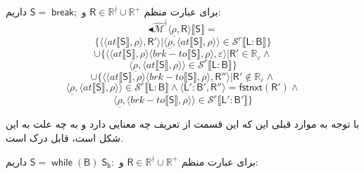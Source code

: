  برای عبارت منظم 
 $\mathsf{R} \in \mathbb{R}^\nmid \cup \mathbb{R^+}$
 و 
 $\mathsf{S= \; break;}$
 داریم:
$$\blacktriangleleft \mathcal{\hat{M}^\nmid} \langle \underline{\rho}, \mathsf{R} \rangle 
\llbracket \mathsf{S} \rrbracket= $$
$$\{\langle \langle at \llbracket \mathsf{S} \rrbracket,\rho \rangle , \mathsf{R'} \rangle | \langle \underline{\rho} , \langle at \llbracket \mathsf{S} \rrbracket , \rho \rangle \rangle \in \mathcal{S}^r \llbracket \mathsf{L:B} \rrbracket\}$$
$$\cup \{ \langle \langle at \llbracket \mathsf{S} \rrbracket , \rho \rangle \langle brk-to \llbracket \mathsf{S} \rrbracket , \rho \rangle , \varepsilon \rangle | \mathsf{R'} \in \mathbb{R_\varepsilon} \land$$
$$\langle \underline{\rho}, \langle at \llbracket \mathsf{S} \rrbracket, \rho \rangle \rangle \in \mathcal{S}^r \llbracket \mathsf{L:B} \rrbracket \}$$
$$\cup \{ \langle \langle at \llbracket \mathsf{S} \rrbracket , \rho \rangle \langle brk-to \llbracket \mathsf{S} \rrbracket,\rho \rangle ,\mathsf{R''} \rangle | \mathsf{R'} \notin \mathbb{R_\varepsilon} \land$$
$$ \langle \underline{\rho},\langle at \llbracket \mathsf{S} \rrbracket , \rho \rangle \rangle \in \mathcal{S}^r \llbracket \mathsf{L:B} \rrbracket \land \langle \mathsf{L':B',R''} \rangle = \mathsf{fstnxt(R') \land}$$
$$\langle \underline{\rho}, \langle brk-to \llbracket \mathsf{S} \rrbracket, \rho \rangle \rangle \in \mathcal{S}^r \llbracket \mathsf{L':B'} \rrbracket \}$$
	    
 با توجه به موارد قبلی این که این قسمت از تعریف چه معنایی دارد و به چه علت به این شکل است، قابل درک است.
 
 برای عبارت منظم 
 $\mathsf{R} \in \mathbb{R}^\nmid \cup \mathbb{R^+}$
 و 
 $\mathsf{S= \; while \; (B) \; S_b:}$
 داریم:
 
